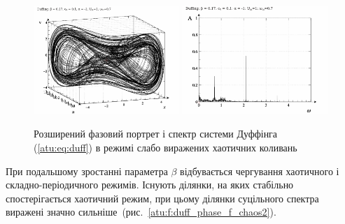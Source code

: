 \begin{figure}[ht!]
\begin{center}
  \includegraphics[width=0.49\textwidth]{p/cha/duff/duff_p_1x00_0x70_0x17.png}
  \hfill
  \includegraphics[width=0.49\textwidth]{p/cha/duff/duff_f_1x00_0x70_0x17.png}
\end{center}
\caption{Розширений фазовий портрет і спектр системи Дуффінга (\ref{atu:eq:duff}) в режимі слабо виражених хаотичних коливань}
\label{atu:f:duff_phase_f_chaos1}
\end{figure}


При подальшому зростанні параметра
$ \beta $ відбувається чергування хаотичного і складно-періодичного
режимів. Існують ділянки, на яких стабільно спостерігається
хаотичний режим, при цьому ділянки суцільного спектра виражені значно
сильніше~(рис.~\ref{atu:f:duff_phase_f_chaos2}).

